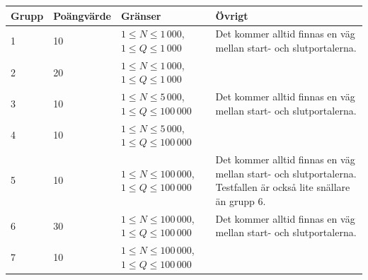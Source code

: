 \begin{tabular}{| l | l | l | l |}
\hline
Grupp & Poängvärde & Gränser & Övrigt\\ \hline
1     & 10         & $ 1 \le N \le 1\,000$,$1 \le Q \le 1\,000$ & Det kommer alltid finnas en väg mellan start- och slutportalerna.\\ \hline
2     & 20         & $ 1 \le N \le 1\,000$,$1 \le Q \le 1\,000$ &  \\ \hline
3     & 10         & $ 1 \le N \le 5\,000$,$1 \le Q \le 100\,000$ & Det kommer alltid finnas en väg mellan start- och slutportalerna.\\ \hline
4     & 10         & $ 1 \le N \le 5\,000$,$1 \le Q \le 100\,000$ &  \\ \hline
5     & 10         & $ 1 \le N \le 100\,000$,$1 \le Q \le 100\,000$ & Det kommer alltid finnas en väg mellan start- och slutportalerna. Testfallen är också lite snällare än grupp 6.\\ \hline
6     & 30         & $ 1 \le N \le 100\,000$,$1 \le Q \le 100\,000$ & Det kommer alltid finnas en väg mellan start- och slutportalerna. \\ \hline
7     & 10         & $ 1 \le N \le 100\,000$,$1 \le Q \le 100\,000$ &  \\ \hline
\end{tabular}
